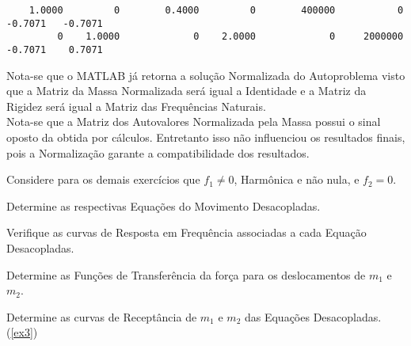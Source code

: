 \documentclass{article}
\begin{document}
\begin{resolution}
\begin{scriptsize}
\begin{lstlisting}
    1.0000         0        0.4000         0        400000           0          -0.7071   -0.7071
         0    1.0000             0    2.0000             0     2000000          -0.7071    0.7071
    \end{lstlisting}
    \end{scriptsize}
    Nota-se que o MATLAB já retorna a solução Normalizada do Autoproblema visto que a Matriz da Massa Normalizada será igual a Identidade e a Matriz da Rigidez será igual a Matriz das Frequências Naturais.\\

    Nota-se que a Matriz dos Autovalores Normalizada pela Massa possui o sinal oposto da obtida por cálculos. Entretanto isso não influenciou os resultados finais, pois a Normalização garante a compatibilidade dos resultados.
\end{resolution}


\newpage\begin{exercise}\label{ex3}
    Considere para os demais exercícios que $f_1 \neq 0$, Harmônica e não nula, e $f_2 = 0$.
\end{exercise}
\begin{exercise}\label{ex4}
    Determine as respectivas Equações do Movimento Desacopladas.
\end{exercise}
\begin{resolution}
    
\end{resolution}


\newpage\begin{exercise}\label{ex5}
    Verifique as curvas de Resposta em Frequência associadas a cada Equação Desacopladas.
\end{exercise}
\begin{resolution}
    
\end{resolution}


\newpage\begin{exercise}\label{ex6}
    Determine as Funções de Transferência da força para os deslocamentos de $m_1$ e $m_2$.
\end{exercise}
\begin{resolution}
    
\end{resolution}


\newpage\begin{exercise}\label{ex7}
    Determine as curvas de Receptância de $m_1$ e $m_2$ das Equações Desacopladas. (\ref{ex3})
\end{exercise}
\begin{resolution}
    
\end{resolution}
\end{document}
